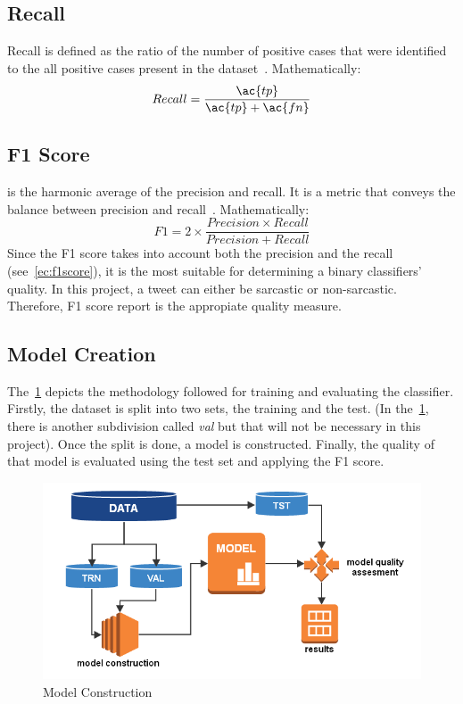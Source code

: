 \subsection{Recall}
Recall is defined as the ratio of the number of positive cases that were identified to the all positive cases present in the dataset~\cite{f1score}. Mathematically:
\begin{equation}
	Recall = \frac{\ac{tp}}{\ac{tp}+\ac{fn}}
	\label{ec:recall}
\end{equation}
\subsection{F1 Score}
is the harmonic average of the precision and recall. It is a metric that conveys the balance between precision and recall~\cite{f1score}. Mathematically:
\begin{equation}
	F1 = 2\times \frac{Precision \times Recall}{Precision + Recall}
	\label{ec:f1score}
\end{equation}
Since the F1 score takes into account both the precision and the recall (see~\cref{ec:f1score}), it is the most suitable for determining a binary classifiers' quality. In this project, a tweet can either be sarcastic or non-sarcastic. Therefore, F1 score report is the appropiate quality measure.
\subsection{Model Creation}
\label{sec:modcons}
The~\cref{fig:modcons} depicts the methodology followed for training and evaluating the classifier. Firstly, the dataset is split into two sets, the training and the test. (In the~\cref{fig:modcons}, there is another subdivision called \textit{val} but that will not be necessary in this project). Once the split is done, a model is constructed. Finally, the quality of that model is evaluated using the test set and applying the F1 score.
\begin{figure}
	\includegraphics[width=\linewidth]{img/model_construction.png}
	\caption{Model Construction~\cite{modcons}}
	\label{fig:modcons}
\end{figure}
